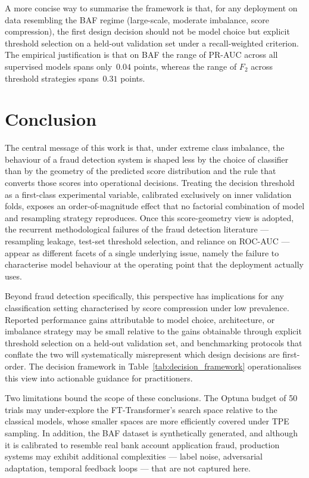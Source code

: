 \documentclass[a4paper,fleqn]{cas-sc}
\begin{document}
A more concise way to summarise the framework is that, for any deployment on data
resembling the BAF regime (large-scale, moderate imbalance, score compression), the
first design decision should not be model choice but explicit threshold selection on
a held-out validation set under a recall-weighted criterion. The empirical justification
is that on BAF the range of PR-AUC across all supervised models spans only~$0.04$
points, whereas the range of $F_2$ across threshold strategies spans~$0.31$ points.

\section{Conclusion}
\label{sec:conclusion}

The central message of this work is that, under extreme class imbalance, the behaviour
of a fraud detection system is shaped less by the choice of classifier than by the
geometry of the predicted score distribution and the rule that converts those scores
into operational decisions. Treating the decision threshold as a first-class
experimental variable, calibrated exclusively on inner validation folds, exposes an
order-of-magnitude effect that no factorial combination of model and resampling
strategy reproduces. Once this score-geometry view is adopted, the recurrent
methodological failures of the fraud detection literature --- resampling leakage,
test-set threshold selection, and reliance on ROC-AUC --- appear as different facets
of a single underlying issue, namely the failure to characterise model behaviour at
the operating point that the deployment actually uses.

Beyond fraud detection specifically, this perspective has implications for any
classification setting characterised by score compression under low prevalence.
Reported performance gains attributable to model choice, architecture, or imbalance
strategy may be small relative to the gains obtainable through explicit threshold
selection on a held-out validation set, and benchmarking protocols that conflate the
two will systematically misrepresent which design decisions are first-order. The
decision framework in Table~\ref{tab:decision_framework} operationalises this view
into actionable guidance for practitioners.

Two limitations bound the scope of these conclusions. The Optuna budget of 50 trials
may under-explore the FT-Transformer's search space relative to the classical models,
whose smaller spaces are more efficiently covered under TPE sampling. In addition, the
BAF dataset is synthetically generated, and although it is calibrated to resemble
real bank account application fraud, production systems may exhibit additional
complexities --- label noise, adversarial adaptation, temporal feedback loops --- that
are not captured here.
\end{document}
